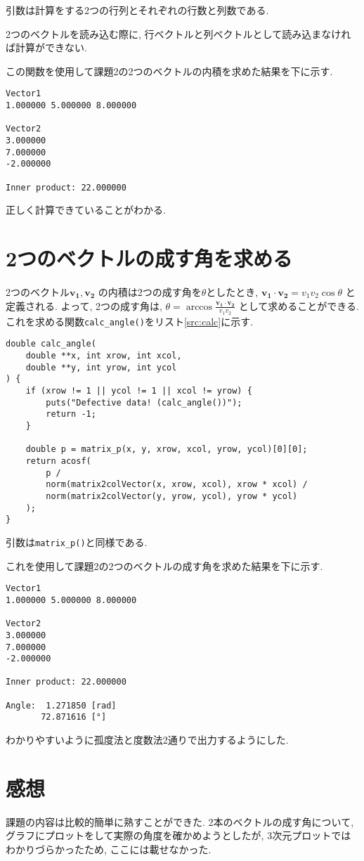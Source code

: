 \documentclass{jsarticle}
\begin{document}
        引数は計算をする2つの行列とそれぞれの行数と列数である.
        
        2つのベクトルを読み込む際に,
        行ベクトルと列ベクトルとして読み込まなければ計算ができない.

        この関数を使用して課題2の2つのベクトルの内積を求めた結果を下に示す.

        \begin{verbatim}
Vector1
1.000000 5.000000 8.000000 

Vector2
3.000000 
7.000000 
-2.000000 

Inner product: 22.000000
        \end{verbatim}

        正しく計算できていることがわかる.

    \section{2つのベクトルの成す角を求める}
        2つのベクトル$\bm{v_1}, \bm{v_2}$
        の内積は2つの成す角を$\theta$としたとき,
        $\bm{v_1} \cdot \bm{v_2} = v_1v_2\cos{\theta}$
        と定義される.
        よって, 2つの成す角は,
        $\displaystyle \theta = \arccos{\frac{\bm{v_1} \cdot \bm{v_2}}{v_1 v_2}}$
        として求めることができる.
        これを求める関数\verb|calc_angle()|をリスト\ref{src:calc}に示す.

        \begin{lstlisting}[caption=calc\_angle.c, label=src:calc]
double calc_angle(
    double **x, int xrow, int xcol, 
    double **y, int yrow, int ycol
) {
    if (xrow != 1 || ycol != 1 || xcol != yrow) {
        puts("Defective data! (calc_angle())");
        return -1;
    }

    double p = matrix_p(x, y, xrow, xcol, yrow, ycol)[0][0];
    return acosf(
        p /
        norm(matrix2colVector(x, xrow, xcol), xrow * xcol) /
        norm(matrix2colVector(y, yrow, ycol), yrow * ycol)
    );
}\end{lstlisting}

        引数は\verb|matrix_p()|と同様である.

        これを使用して課題2の2つのベクトルの成す角を求めた結果を下に示す.

        \begin{verbatim}
Vector1
1.000000 5.000000 8.000000 

Vector2
3.000000 
7.000000 
-2.000000 

Inner product: 22.000000

Angle:  1.271850 [rad]
       72.871616 [°]
        \end{verbatim}

        わかりやすいように孤度法と度数法2通りで出力するようにした.

    \section{感想}
        課題の内容は比較的簡単に熟すことができた.
        2本のベクトルの成す角について,
        グラフにプロットをして実際の角度を確かめようとしたが,
        3次元プロットではわかりづらかったため,
        ここには載せなかった.
\end{document}

